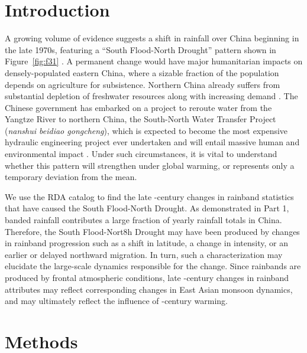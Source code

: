 \documentclass{ametsoc}
\begin{document}

\section{Introduction}

	A growing volume of evidence suggests a shift in rainfall over China beginning in the late 1970s, featuring a ``South Flood-North Drought'' pattern shown in Figure~\ref{fig:f31} \citep{Hu1997,Gong2002,Nigam2013}.  A permanent change would have major humanitarian impacts on densely-populated eastern China, where a sizable fraction of the population depends on agriculture for subsistence. Northern China already suffers from substantial depletion of freshwater resources along with increasing demand \citep{Currell2012,Gleeson2012}. The Chinese government has embarked on a project to reroute water from the Yangtze River to northern China, the South-North Water Transfer Project (\textit{nanshui beidiao gongcheng}), which is expected to become the most expensive hydraulic engineering project ever undertaken and will entail massive human and environmental impact \citep{Magee2011}. Under such circumstances, it is vital to understand whether this pattern will strengthen under global warming, or represents only a temporary deviation from the mean. 
	
	We use the RDA catalog to find the late -century changes in rainband statistics that have caused the South Flood-North Drought. As demonstrated in Part 1, banded rainfall contributes a large fraction of yearly rainfall totals in China. Therefore, the South Flood-Nort8h Drought may have been produced by changes in rainband progression such as a shift in latitude, a change in intensity, or an earlier or delayed northward migration. In turn, such a characterization may elucidate the large-scale dynamics responsible for the change. Since rainbands are produced by frontal atmospheric conditions, late -century changes in rainband attributes may reflect corresponding changes in East Asian monsoon dynamics, and may ultimately reflect the influence of -century warming. 

\section{Methods}
\end{document}
